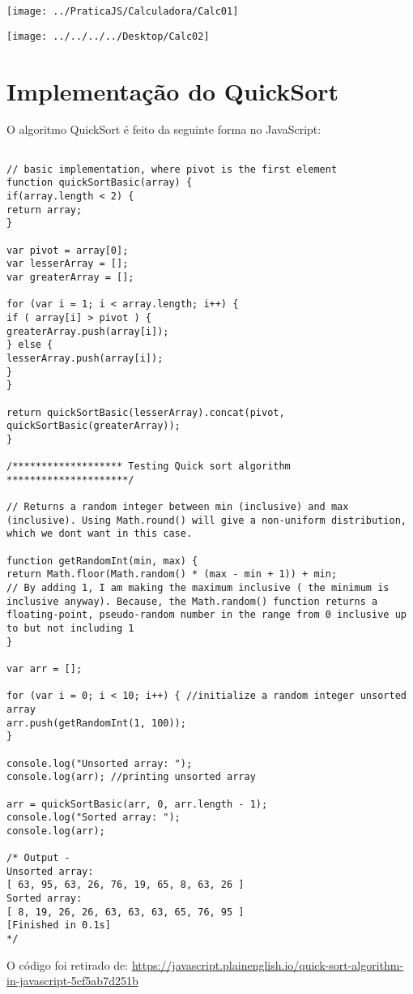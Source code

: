 	
	
	
	\texttt{[image: ../PraticaJS/Calculadora/Calc01]}

	
	\texttt{[image: ../../../../Desktop/Calc02]}



    \section{Implementação do QuickSort}
	O algoritmo QuickSort é feito da seguinte forma no JavaScript:
	\newline
\begin{lstlisting}

// basic implementation, where pivot is the first element
function quickSortBasic(array) {
if(array.length < 2) {
return array;
}

var pivot = array[0];
var lesserArray = [];
var greaterArray = [];

for (var i = 1; i < array.length; i++) {
if ( array[i] > pivot ) {
greaterArray.push(array[i]);
} else {
lesserArray.push(array[i]);
}
}

return quickSortBasic(lesserArray).concat(pivot, quickSortBasic(greaterArray));
}

/******************* Testing Quick sort algorithm *********************/

// Returns a random integer between min (inclusive) and max (inclusive). Using Math.round() will give a non-uniform distribution, which we dont want in this case.

function getRandomInt(min, max) {
return Math.floor(Math.random() * (max - min + 1)) + min;
// By adding 1, I am making the maximum inclusive ( the minimum is inclusive anyway). Because, the Math.random() function returns a floating-point, pseudo-random number in the range from 0 inclusive up to but not including 1
}

var arr = [];

for (var i = 0; i < 10; i++) { //initialize a random integer unsorted array
arr.push(getRandomInt(1, 100));
}

console.log("Unsorted array: ");
console.log(arr); //printing unsorted array

arr = quickSortBasic(arr, 0, arr.length - 1);
console.log("Sorted array: ");
console.log(arr);

/* Output - 
Unsorted array: 
[ 63, 95, 63, 26, 76, 19, 65, 8, 63, 26 ]
Sorted array: 
[ 8, 19, 26, 26, 63, 63, 63, 65, 76, 95 ]
[Finished in 0.1s]
*/

\end{lstlisting}
O código foi retirado de:
\url{https://javascript.plainenglish.io/quick-sort-algorithm-in-javascript-5cf5ab7d251b}


